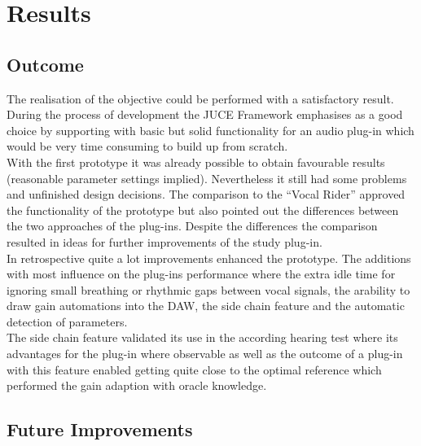 \chapter{Results}
\label{chapter:results}

\section{Outcome}

The realisation of the objective could be performed with a satisfactory result. During the process of development the JUCE Framework emphasises as a good choice by supporting with basic but solid functionality for an audio plug-in which would be very time consuming to build up from scratch.\\
With the first prototype it was already possible to obtain favourable results (reasonable parameter settings implied). Nevertheless it still had some problems and unfinished design decisions. The comparison to the “Vocal Rider” approved the functionality of the prototype but also pointed out the differences between the two approaches of the plug-ins. Despite the differences the comparison resulted in ideas for further improvements of the study plug-in.\\
In retrospective quite a lot improvements enhanced the prototype. The additions with most influence on the plug-ins performance where the extra idle time for ignoring small breathing or rhythmic gaps between vocal signals, the arability to draw gain automations into the DAW, the side chain feature and the automatic detection of parameters.\\
The side chain feature validated its use in the according hearing test where its advantages for the plug-in where observable as well as the outcome of a plug-in with this feature enabled getting quite close to the optimal reference which performed the gain adaption with oracle knowledge.\\

\section{Future Improvements}

